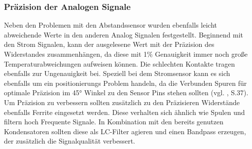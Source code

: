\subsubsection{Präzision der Analogen Signale}
\label{Mangelnde_Präzision}
Neben den Problemen mit den Abstandssensor wurden ebenfalls leicht abweichende Werte in den anderen Analog Signalen festgestellt. Beginnend mit den Strom Signalen, kann der ausgelesene Wert mit der Präzision des Widerstandes zusammenhängen, da diese mit 1\% Genauigkeit immer noch große Temperaturabweichungen aufweisen können. Die schlechten Kontakte tragen ebenfalls zur Ungenauigkeit bei. Speziell bei dem Stromsensor kann es sich ebenfalls um ein positionierungs Problem handeln, da die Verbunden Spuren für optimale Präzision im 45° Winkel zu den Sensor Pins stehen sollten (vgl. \cite{Stromsensor_texas}, S.37). Um Präzision zu verbessern sollten zusätzlich zu den Präzisieren Widerstände ebenfalls Ferrite eingesetzt werden. Diese verhalten sich ähnlich wie Spulen und filtern hoch Frequente Signale. In Kombination mit den bereits genutzen Kondensatoren sollten diese als LC-Filter agieren und einen Bandpass erzeugen, der zusätzlich die Signalqualität verbessert.\\